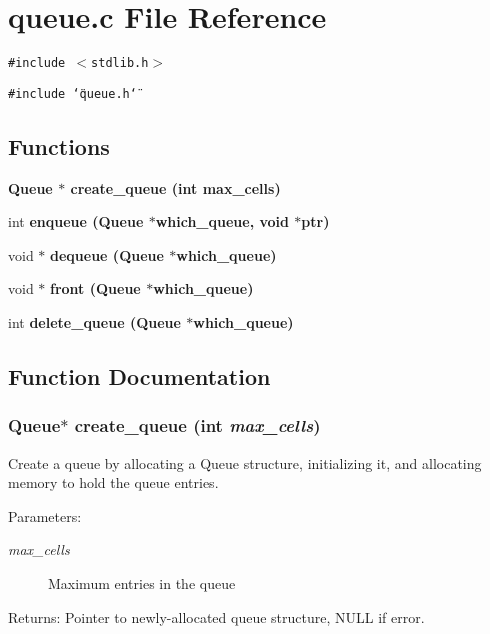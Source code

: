 \section{queue.c File Reference}
\label{queue_8c}
{\tt \#include $<$stdlib.h$>$}\par
{\tt \#include \char`\"{}queue.h\char`\"{}}\par
\subsection*{Functions}
\begin{CompactItemize}
\item 
\bf{Queue} $\ast$ \bf{create\_\-queue} (int max\_\-cells)
\item 
int \bf{enqueue} (\bf{Queue} $\ast$which\_\-queue, void $\ast$ptr)
\item 
void $\ast$ \bf{dequeue} (\bf{Queue} $\ast$which\_\-queue)
\item 
void $\ast$ \bf{front} (\bf{Queue} $\ast$which\_\-queue)
\item 
int \bf{delete\_\-queue} (\bf{Queue} $\ast$which\_\-queue)
\end{CompactItemize}


\subsection{Function Documentation}
\subsubsection{\setlength{\rightskip}{0pt plus 5cm}\bf{Queue}$\ast$ create\_\-queue (int {\em max\_\-cells})}\label{queue_8c_b710f6637419a761df20688da7ece206}


Create a queue by allocating a Queue structure, initializing it, and allocating memory to hold the queue entries. \begin{Desc}
\item[Parameters:]
\begin{description}
\item[{\em max\_\-cells}]Maximum entries in the queue \end{description}
\end{Desc}
\begin{Desc}
\item[Returns:]Pointer to newly-allocated queue structure, NULL if error. \end{Desc}
